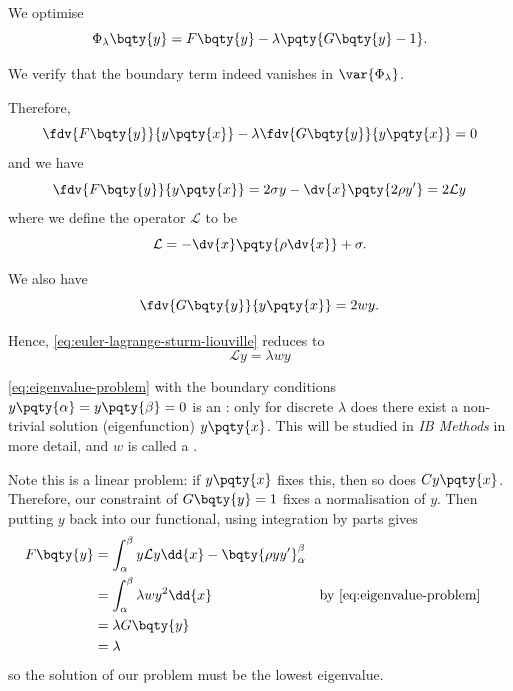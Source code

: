 \begin{example}
    We optimise
    \[
        \Phi_{\lambda} \bqty{y} = F\bqty{y} - \lambda \pqty{G\bqty{y} - 1}.
    \]

    We verify that the boundary term indeed vanishes in \(\var{\Phi_{\lambda}}\).

    Therefore,
    \begin{equation}
        \label{eq:euler-lagrange-sturm-liouville}
        \fdv{F\bqty{y}}{y\pqty{x}} - \lambda \fdv{G\bqty{y}}{y\pqty{x}} = 0
    \end{equation}
    and we have
    \[
        \fdv{F\bqty{y}}{y\pqty{x}} = 2 \sigma y - \dv{x} \pqty{2 \rho y'} = 2 \mathcal{L} y
    \]
    where we define the operator \(\mathcal{L}\) to be
    \[
        \mathcal{L} = - \dv{x} \pqty{\rho \dv{x}} + \sigma.
    \]

    We also have
    \[
        \fdv{G\bqty{y}}{y\pqty{x}} = 2 w y.
    \]

    Hence, \eqref{eq:euler-lagrange-sturm-liouville} reduces to
    \begin{equation}
        \label{eq:eigenvalue-problem}%
        \mathcal{L} y = \lambda w y
    \end{equation}

    \eqref{eq:eigenvalue-problem} with the boundary conditions \(y\pqty{\alpha} = y\pqty{\beta} = 0\) is an : only for discrete \(\lambda\) does there exist a non-trivial solution (eigenfunction) \(y\pqty{x}\). This will be studied in \textit{IB Methods} in more detail, and \(w\) is called a .

    Note this is a linear problem: if \(y \pqty{x}\) fixes this, then so does \(C y \pqty{x}\). Therefore, our constraint of \(G\bqty{y} = 1\) fixes a normalisation of \(y\). Then putting \(y\) back into our functional, using integration by parts gives
    \begin{align*}
        F\bqty{y} &= \int_{\alpha}^{\beta} y \mathcal{L} y \dd{x} - \bqty{\rho y y'}_{\alpha}^{\beta} \\
        &= \int_{\alpha}^{\beta} \lambda w y^2 \dd{x} && \text{by \eqref{eq:eigenvalue-problem}} \\
        &= \lambda G\bqty{y} \\
        &= \lambda
    \end{align*}
    so the solution of our problem must be the lowest eigenvalue.
\end{example}

